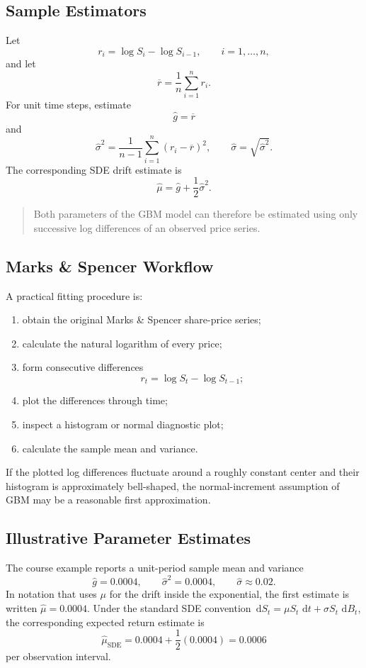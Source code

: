 \documentclass[12pt,openany]{book}
\theoremstyle{definition}
\theoremstyle{remark}
\newcommand{\dd}{\,\mathrm{d}}
\begin{document}
\subsection{Sample Estimators}

Let
\[
r_i=\log S_i-\log S_{i-1},
\qquad i=1,\ldots,n,
\]
and let
\[
\overline r=\frac1n\sum_{i=1}^{n}r_i.
\]
For unit time steps, estimate
\[
\boxed{\widehat g=\overline r}
\]
and
\[
\boxed{
\widehat{\sigma}^2
=\frac{1}{n-1}\sum_{i=1}^{n}(r_i-\overline r)^2,
\qquad
\widehat\sigma=\sqrt{\widehat{\sigma}^2}.
}
\]
The corresponding SDE drift estimate is
\[
\boxed{
\widehat\mu
=\widehat g+\frac12\widehat{\sigma}^2.
}
\]

\begin{quote}
Both parameters of the GBM model can therefore be estimated using only
successive log differences of an observed price series.
\end{quote}

\subsection{Marks \& Spencer Workflow}

A practical fitting procedure is:
\begin{enumerate}
    \item obtain the original Marks \& Spencer share-price series;
    \item calculate the natural logarithm of every price;
    \item form consecutive differences
    \[
    r_t=\log S_t-\log S_{t-1};
    \]
    \item plot the differences through time;
    \item inspect a histogram or normal diagnostic plot;
    \item calculate the sample mean and variance.
\end{enumerate}

If the plotted log differences fluctuate around a roughly constant center
and their histogram is approximately bell-shaped, the normal-increment
assumption of GBM may be a reasonable first approximation.

\subsection{Illustrative Parameter Estimates}

The course example reports a unit-period sample mean and variance
\[
\widehat g=0.0004,
\qquad
\widehat{\sigma}^2=0.0004,
\qquad
\widehat\sigma\approx0.02.
\]
In notation that uses \(\mu\) for the drift inside the exponential, the first
estimate is written \(\widehat\mu=0.0004\). Under the standard SDE convention
\(\dd S_t=\mu S_t\,\dd t+\sigma S_t\,\dd B_t\), the corresponding expected
return estimate is
\[
\widehat\mu_{\mathrm{SDE}}
=0.0004+\frac12(0.0004)
=0.0006
\]
per observation interval.
\end{document}
